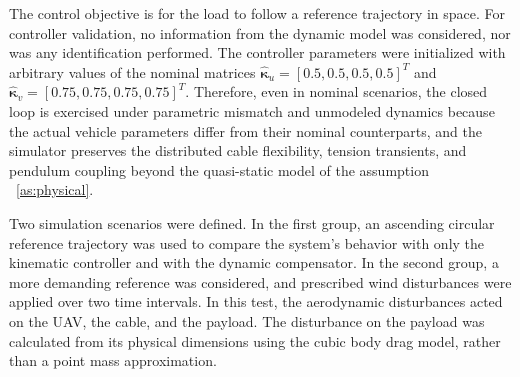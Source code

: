 \documentclass[sn-mathphys-num]{sn-jnl}
\theoremstyle{thmstyleone}%
\theoremstyle{thmstyletwo}%
\theoremstyle{thmstylethree}%
\begin{document}
The control objective is for the load to follow a reference trajectory in space. For controller validation, no information from the dynamic model was considered, nor was any identification performed. The controller parameters were initialized with arbitrary values of the nominal matrices $\hat{\boldsymbol{\kappa}}_u = [0.5, 0.5, 0.5, 0.5]^T$ and $\hat{\boldsymbol{\kappa}}_v = [0.75, 0.75, 0.75, 0.75]^T$. Therefore, even in nominal scenarios, the closed loop is exercised under parametric mismatch and unmodeled dynamics because the actual vehicle parameters differ from their nominal counterparts, and the simulator preserves the distributed cable flexibility, tension transients, and pendulum coupling beyond the quasi-static model of the assumption ~\ref{as:physical}.

Two simulation scenarios were defined. In the first group, an ascending circular reference trajectory was used to compare the system's behavior with only the kinematic controller and with the dynamic compensator. In the second group, a more demanding reference was considered, and prescribed wind disturbances were applied over two time intervals. In this test, the aerodynamic disturbances acted on the UAV, the cable, and the payload. The disturbance on the payload was calculated from its physical dimensions using the cubic body drag model, rather than a point mass approximation.  
\end{document}
